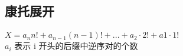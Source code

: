 \subsection{康托展开}
\paragraph{}
$ X = a_n  n! + a_{n-1}  (n - 1)! + ... + a_2 \cdot 2! + a1 \cdot 1! $ \\
$ a_i $ 表示 i 开头的后缀中逆序对的个数


